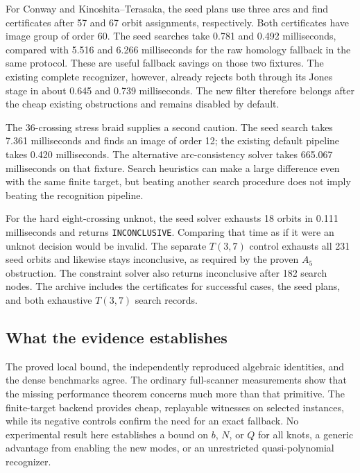 For Conway and Kinoshita--Terasaka, the seed plans use three arcs and find
certificates after 57 and 67 orbit assignments, respectively. Both
certificates have image group of order 60. The seed searches take
0.781 and 0.492 milliseconds, compared with 5.516 and 6.266 milliseconds
for the raw homology fallback in the same protocol. These are useful
fallback savings on those two fixtures. The existing complete recognizer,
however, already rejects both through its Jones stage in about
0.645 and 0.739 milliseconds. The new filter therefore belongs after
the cheap existing obstructions and remains disabled by default.

The 36-crossing stress braid supplies a second caution. The seed search
takes 7.361 milliseconds and finds an image of order 12; the existing
default pipeline takes 0.420 milliseconds. The alternative arc-consistency
solver takes 665.067 milliseconds on that fixture. Search heuristics can
make a large difference even with the same finite target, but beating
another search procedure does not imply beating the recognition pipeline.

For the hard eight-crossing unknot, the seed solver exhausts 18 orbits in
0.111 milliseconds and returns \texttt{INCONCLUSIVE}. Comparing that
time as if it were an unknot decision would be invalid. The separate
$T(3,7)$ control exhausts all 231 seed orbits and likewise stays
inconclusive, as required by the proven $A_5$ obstruction. The constraint
solver also returns inconclusive after 182 search nodes. The archive
includes the certificates for successful cases, the seed plans, and both
exhaustive $T(3,7)$ search records.

\subsection{What the evidence establishes}

The proved local bound, the independently reproduced algebraic identities,
and the dense benchmarks agree. The ordinary full-scanner measurements
show that the missing performance theorem concerns much more than that
primitive. The finite-target backend provides cheap, replayable witnesses
on selected instances, while its negative controls confirm the need for
an exact fallback. No experimental result here establishes a bound on
$b$, $N$, or $Q$ for all knots, a generic advantage from enabling the new
modes, or an unrestricted quasi-polynomial recognizer.
